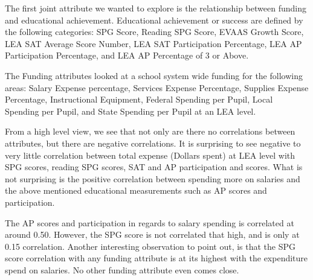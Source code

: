 \documentclass[11pt]{article}
\begin{document}
The first joint attribute we wanted to explore is the relationship
between funding and educational achievement. Educational achievement or
success are defined by the following categories: SPG Score, Reading SPG
Score, EVAAS Growth Score, LEA SAT Average Score Number, LEA SAT
Participation Percentage, LEA AP Participation Percentage, and LEA AP
Percentage of 3 or Above.

The Funding attributes looked at a school system wide funding for the
following areas: Salary Expense percentage, Services Expense Percentage,
Supplies Expense Percentage, Instructional Equipment, Federal Spending
per Pupil, Local Spending per Pupil, and State Spending per Pupil at an
LEA level.

From a high level view, we see that not only are there no correlations
between attributes, but there are negative correlations. It is
surprising to see negative to very little correlation between total
expense (Dollars spent) at LEA level with SPG scores, reading SPG
scores, SAT and AP participation and scores. What is not surprising is
the positive correlation between spending more on salaries and the above
mentioned educational measurements such as AP scores and participation.

The AP scores and participation in regards to salary spending is
correlated at around 0.50. However, the SPG score is not correlated that
high, and is only at 0.15 correlation. Another interesting observation
to point out, is that the SPG score correlation with any funding
attribute is at its highest with the expenditure spend on salaries. No
other funding attribute even comes close.
\end{document}
